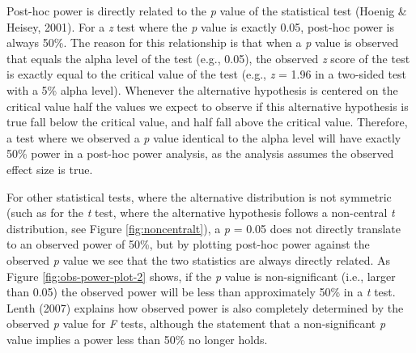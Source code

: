 \documentclass[
  english,
  ,jou, a4paper,floatsintext]{apa6}
\begin{document}
Post-hoc power is directly related to the \emph{p} value of the statistical test (Hoenig \& Heisey, 2001). For a \emph{z} test where the \emph{p} value is exactly 0.05, post-hoc power is always 50\%. The reason for this relationship is that when a \emph{p} value is observed that equals the alpha level of the test (e.g., 0.05), the observed \emph{z} score of the test is exactly equal to the critical value of the test (e.g., \emph{z} = 1.96 in a two-sided test with a 5\% alpha level). Whenever the alternative hypothesis is centered on the critical value half the values we expect to observe if this alternative hypothesis is true fall below the critical value, and half fall above the critical value. Therefore, a test where we observed a \emph{p} value identical to the alpha level will have exactly 50\% power in a post-hoc power analysis, as the analysis assumes the observed effect size is true.

For other statistical tests, where the alternative distribution is not symmetric (such as for the \emph{t} test, where the alternative hypothesis follows a non-central \emph{t} distribution, see Figure \ref{fig:noncentralt}), a \emph{p} = 0.05 does not directly translate to an observed power of 50\%, but by plotting post-hoc power against the observed \emph{p} value we see that the two statistics are always directly related. As Figure \ref{fig:obs-power-plot-2} shows, if the \emph{p} value is non-significant (i.e., larger than 0.05) the observed power will be less than approximately 50\% in a \emph{t} test. Lenth (2007) explains how observed power is also completely determined by the observed \emph{p} value for \emph{F} tests, although the statement that a non-significant \emph{p} value implies a power less than 50\% no longer holds.
\end{document}
